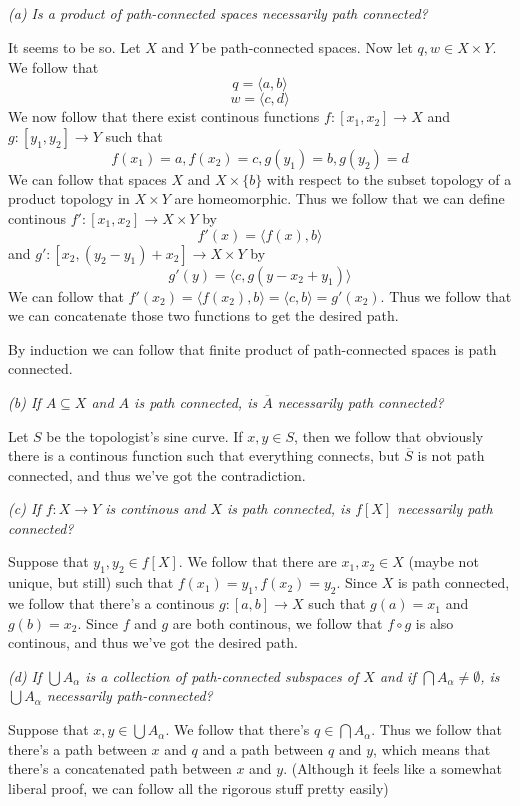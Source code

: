 \documentclass[11pt,oneside,titlepage]{book}
\newcommand{\eangle}[1]{\langle #1 \rangle}
\newcommand{\set}[1]{\{ #1 \}}
\begin{document}
\subsection{}

\textit{(a) Is a product of path-connected spaces necessarily path connected?}

It seems to be so. Let $X$ and $Y$ be path-connected spaces. Now let $q, w \in X \times Y$.
We follow that
$$q = \eangle{a, b}$$
$$w = \eangle{c, d}$$
We now follow that there exist continous functions $f: [x_1, x_2] \to X$ and $g: [y_1, y_2] \to Y$
such that 
$$f(x_1) = a, f(x_2) = c, g(y_1) = b, g(y_2) = d$$
We can follow that spaces $X$ and $X \times \set{b}$ with respect to the subset topology of a
product topology in $X \times Y$ are homeomorphic. Thus we follow that we can define
continous 
$f': [x_1, x_2] \to X \times Y$ by
$$f'(x) = \eangle{f(x), b}$$
and $g': [x_2, (y_2 - y_1) +  x_2] \to X \times Y$ by
$$g'(y) = \eangle{c, g(y - x_2 + y_1)}$$
We can follow that $f'(x_2) = \eangle{f(x_2), b} = \eangle{c, b} = g'(x_2)$. Thus we follow that
we can concatenate those two functions to get the desired path.

By induction we can follow that finite product of path-connected spaces is path connected.

\textit{(b) If $A \subseteq X$ and $A$ is path connected, is $\overline{A}$ necessarily
  path connected?}

Let $S$ be the topologist's sine curve. If $x, y\in S$, then we follow that obviously there
is a continous function such that everything connects, but $\overline{S}$ is not
path connected, and thus we've got the contradiction.

\textit{(c) If $f: X \to Y$ is continous and $X$ is path connected, is $f[X]$ necessarily
  path connected?}

Suppose that $y_1, y_2 \in f[X]$. We follow that there are $x_1, x_2 \in X$ (maybe not unique,
but still) such that $f(x_1) = y_1, f(x_2) = y_2$. Since $X$ is path connected, we follow that
there's a continous $g: [a, b] \to X$ such that $g(a) = x_1$ and $g(b) = x_2$.
Since $f$ and $g$ are both continous, we follow that
$f \circ g$ is also continous, and thus we've got the desired path.

\textit{(d) If $\bigcup{A_\alpha}$ is a collection of path-connected subspaces of $X$
  and if $\bigcap{A_\alpha} \neq \emptyset$, is $\bigcup{A_\alpha}$ necessarily
  path-connected?}

Suppose that $x, y \in \bigcup{A_\alpha}$. We follow that there's
$q \in \bigcap{A_\alpha}$. Thus we follow that there's a path between $x$ and $q$ and
a path between $q$ and $y$, which means that there's a concatenated path between $x$ and $y$.
(Although it feels like a somewhat liberal proof, we can follow all the rigorous stuff
pretty easily)
\end{document}
